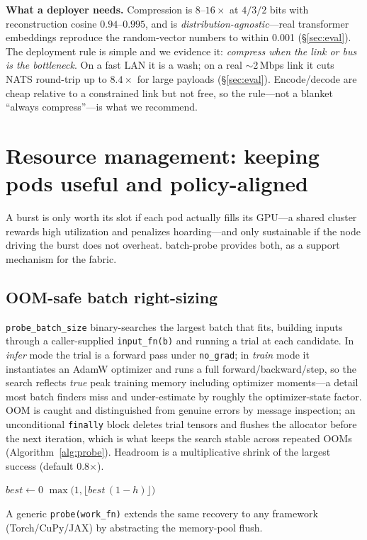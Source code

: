 \documentclass[conference]{IEEEtran}
\begin{document}
\textbf{What a deployer needs.} Compression is $8$--$16\times$ at $4/3/2$ bits with reconstruction
cosine $0.94$--$0.995$, and is \emph{distribution-agnostic}---real transformer embeddings reproduce
the random-vector numbers to within 0.001 (\S\ref{sec:eval}). The deployment rule is simple and we
evidence it: \emph{compress when the link or bus is the bottleneck}. On a fast LAN it is a wash; on
a real $\sim$2\,Mbps link it cuts NATS round-trip up to $8.4\times$ for large payloads
(\S\ref{sec:eval}). Encode/decode are cheap relative to a constrained link but not free, so the
rule---not a blanket ``always compress''---is what we recommend.

\section{Resource management: keeping pods useful and policy-aligned}\label{sec:bp}
A burst is only worth its slot if each pod actually fills its GPU---a shared cluster rewards high
utilization and penalizes hoarding---and only sustainable if the node driving the burst does not
overheat. batch-probe provides both, as a support mechanism for the fabric.

\subsection{OOM-safe batch right-sizing}
\texttt{probe\_batch\_size} binary-searches the largest batch that fits, building inputs through a
caller-supplied \texttt{input\_fn(b)} and running a trial at each candidate. In \emph{infer} mode
the trial is a forward pass under \texttt{no\_grad}; in \emph{train} mode it instantiates an AdamW
optimizer and runs a full forward/backward/step, so the search reflects \emph{true} peak training
memory including optimizer moments---a detail most batch finders miss and under-estimate by
roughly the optimizer-state factor. OOM is caught and distinguished from genuine errors by message
inspection; an unconditional \texttt{finally} block deletes trial tensors and flushes the
allocator before the next iteration, which is what keeps the search stable across repeated OOMs
(Algorithm~\ref{alg:probe}). Headroom is a multiplicative shrink of the largest success
(default 0.8$\times$).

\begin{algorithm}[t]
\caption{OOM-safe batch right-sizing (infer mode)}\label{alg:probe}
$best \gets 0$\;
\Return $\max\!\bigl(1,\lfloor best\,(1-h)\rfloor\bigr)$\;
\end{algorithm} A generic
\texttt{probe(work\_fn)} extends the same recovery to any framework (Torch/CuPy/JAX) by abstracting
the memory-pool flush.
\end{document}
